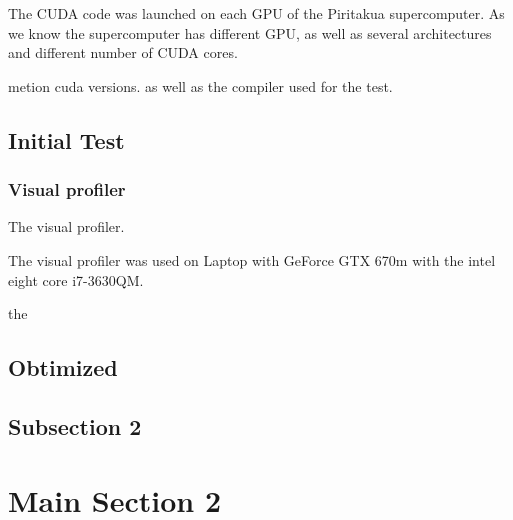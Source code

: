 The CUDA code was launched on each GPU of the Piritakua supercomputer. As we know the supercomputer has different GPU, as well as several architectures and different number of CUDA cores.


metion cuda versions. as well as the compiler used for the test.


\subsection{Initial Test}



\subsubsection{Visual profiler}

The visual profiler.

The visual profiler was used on Laptop with GeForce GTX 670m with the intel eight core  i7-3630QM.


the


\subsection{Obtimized}



\subsection{Subsection 2}


\section{Main Section 2}

